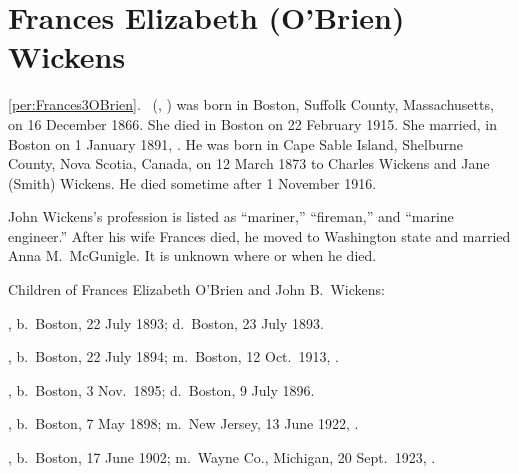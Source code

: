 \section{Frances Elizabeth (O'Brien) Wickens}

\ref{per:Frances3OBrien}.\  (, ) was born in Boston, Suffolk County, Massachusetts, on 16 December 1866.\cite{Frances3OBrienBirth} She died in Boston on 22 February 1915.\cite{Frances3OBrienDeath} She married, in Boston on 1 January 1891, .\cite{JohnWickensMarriage} He was born in Cape Sable Island, Shelburne County, Nova Scotia, Canada, on 12 March 1873\cite{JohnWickensNaturalization} to Charles Wickens and Jane (Smith) Wickens.\cite{JohnWickensMarriage,JohnWickensMarriage2} He died sometime after 1 November 1916.\cite{JohnWickensMarriage2}

John Wickens's profession is listed as ``mariner,''\cite{JohnWickensMarriage} ``fireman,''\cite{JohnWickensNaturalization} and ``marine engineer.''\cite{Census1900JohnWickens} After his wife Frances died, he moved to Washington state and married Anna M.\ McGunigle.\cite{JohnWickensMarriage2} It is unknown where or when he died.

\begin{KidsIntro}
	Children of Frances Elizabeth O'Brien and John B.\ Wickens:
\end{KidsIntro}

\begin{Kids}
	, b.\ Boston, 22 July 1893;\cite{Nellie4WickensDeath} d.\ Boston, 23 July 1893.\cite{Nellie4WickensDeath}
	
	, b.\ Boston, 22 July 1894; m.\ Boston, 12 Oct.\ 1913, .
	
	, b.\ Boston, 3 Nov.\ 1895;\cite{Frederick4WickensBirth} d.\ Boston, 9 July 1896.\cite{Frederick4WickensDeath}
	
	, b.\ Boston, 7 May 1898; m.\ New Jersey, 13 June 1922, .
	
	, b.\ Boston, 17 June 1902; m.\ Wayne Co., Michigan, 20 Sept.\ 1923, .
	
\end{Kids}